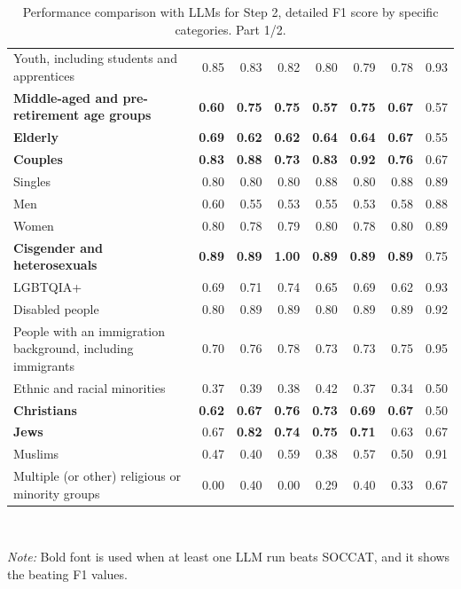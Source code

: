 \begin{table}[htb]
\begin{tabular}{>{\raggedright\arraybackslash}p{4.2cm} r r r r r r r}
Youth, including students and apprentices & 0.85 & 0.83 & 0.82 & 0.80 & 0.79 & 0.78 & 0.93 \\
\textbf{Middle-aged and pre-retirement age groups} & \textbf{0.60} & \textbf{0.75} & \textbf{0.75} & \textbf{0.57} & \textbf{0.75} & \textbf{0.67} & 0.57 \\
\textbf{Elderly} & \textbf{0.69} & \textbf{0.62} & \textbf{0.62} & \textbf{0.64} & \textbf{0.64} & \textbf{0.67} & 0.55 \\
\textbf{Couples} & \textbf{0.83} & \textbf{0.88} & \textbf{0.73} & \textbf{0.83} & \textbf{0.92} & \textbf{0.76} & 0.67 \\
Singles & 0.80 & 0.80 & 0.80 & 0.88 & 0.80 & 0.88 & 0.89 \\
\addlinespace
Men & 0.60 & 0.55 & 0.53 & 0.55 & 0.53 & 0.58 & 0.88 \\
Women & 0.80 & 0.78 & 0.79 & 0.80 & 0.78 & 0.80 & 0.89 \\
\textbf{Cisgender and heterosexuals} & \textbf{0.89} & \textbf{0.89} & \textbf{1.00} & \textbf{0.89} & \textbf{0.89} & \textbf{0.89} & 0.75 \\
LGBTQIA+ & 0.69 & 0.71 & 0.74 & 0.65 & 0.69 & 0.62 & 0.93 \\
Disabled people & 0.80 & 0.89 & 0.89 & 0.80 & 0.89 & 0.89 & 0.92 \\
People with an immigration background, including immigrants & 0.70 & 0.76 & 0.78 & 0.73 & 0.73 & 0.75 & 0.95 \\
Ethnic and racial minorities & 0.37 & 0.39 & 0.38 & 0.42 & 0.37 & 0.34 & 0.50 \\
\textbf{Christians} & \textbf{0.62} & \textbf{0.67} & \textbf{0.76} & \textbf{0.73} & \textbf{0.69} & \textbf{0.67} & 0.50 \\
\textbf{Jews} & 0.67 & \textbf{0.82} & \textbf{0.74} & \textbf{0.75} & \textbf{0.71} & 0.63 & 0.67 \\
Muslims & 0.47 & 0.40 & 0.59 & 0.38 & 0.57 & 0.50 & 0.91 \\
Multiple (or other) religious or minority groups & 0.00 & 0.40 & 0.00 & 0.29 & 0.40 & 0.33 & 0.67 \\
\bottomrule
\end{tabular}
\\
\vspace{2pt}
{\footnotesize \textit{Note:} Bold font is used when at least one LLM run beats SOCCAT, and it shows the beating F1 values.\par}
\caption{Performance comparison with LLMs for Step 2, detailed F1 score by specific categories. Part 1/2.}
\label{tab:llm-step2-1}
\end{table}
